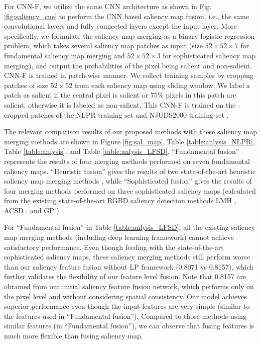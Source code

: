 \documentclass[journal]{IEEEtran}
\begin{document}
For CNN-F, we utilize the same CNN architecture as shown in Fig. \ref{fig:saliency_cue} to perform the CNN based saliency map fusion, i.e., the same convolutional layers and fully connected layers except the input layer.
More specifically, we formulate the saliency map merging as a binary logistic regression problem, which takes several saliency map patches as input (size $52\times52\times7$ for fundamental saliency map merging and $52\times52\times3$ for sophisticated saliency map merging), and output the probabilities of the pixel being salient and non-salient. CNN-F is trained in patch-wise manner. We collect training samples by cropping patches of size $52\times52$ from each saliency map using sliding window. We label a patch as salient if the central pixel is salient or 75\% pixels in this patch are salient, otherwise it is labeled as non-salient. This CNN-F is trained on the cropped patches of the NLPR training set \cite{peng2014rgbd} and NJUDS2000 training set \cite{ju2014depth}.


The relevant comparison results of our proposed methods with these saliency map merging methods are shown in Figure \ref{fig:sal_map},
Table \ref{table:anlysis_NLPR}, Table \ref{table:anlysis}, and Table \ref{table:anlysis_LFSD}.  ``Fundamental fusion'' represents the results of four merging methods performed on seven fundamental saliency maps. ``Heuristic fusion'' gives the results of two state-of-the-art heuristic saliency map merging methods \cite{peng2014rgbd,ren2015exploiting}, while ``Sophisticated fusion'' gives the results of four merging methods performed on three sophisticated saliency maps (calculated from the existing state-of-the-art RGBD saliency detection methods LMH
\cite{peng2014rgbd}, ACSD \cite{ju2014depth}, and GP \cite{ren2015exploiting}).

For ``Fundamental fusion'' in Table \ref{table:anlysis_LFSD}, all the existing saliency map merging methods (including deep learning framework) cannot achieve satisfactory  performance.
Even though feeding with the state-of-the-art sophisticated saliency maps, these saliency merging methods still perform worse than our saliency feature fusion without LP
framework (0.8071 vs 0.8157), which further validates the flexibility of our feature level fusion. Note that 0.8157 are obtained from our initial saliency feature fusion network, which performs only on the pixel level and without considering spatial consistency. Our model achieves superior performance even though the input features are very simple (similar to the features used in ``Fundamental fusion''). Compared to those methods using similar features (in ``Fundamental fusion''), we can observe that fusing features is much more flexible than fusing saliency map.
\end{document}
